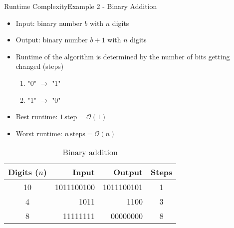 
\begin{frame}{Runtime Complexity}{Example 2 - Binary Addition}
  \begin{itemize}
    \item
      Input: binary number $b$ with $n$ digits
    \item
      Output: binary number $b+1$ with $n$ digits
    \item<2->
      Runtime of the algorithm is determined by the number of bits getting
      changed (steps)
      \begin{enumerate}
        \item "0" $\to$ "1"
        \item "1" $\to$ "0"
      \end{enumerate}
    \item<3->
      {\color{Mittel-Blau}Best runtime:}
      $1\,\text{step} = \mathcal{O}(1)$
    \item<3->
      {\color{Mittel-Blau}Worst runtime:}
      $n\,\text{steps} = \mathcal{O}(n)$
  \end{itemize}
  \vspace{-1.0em}%
  \begin{table}[!h]%
    \caption{Binary addition}%
    \label{tab:runtime:binary_addition}%
    \begin{tabular}{crrc}%
      Digits ($n$) & Input & Output & Steps\\
      \midrule
      10 & 1011100100 & 1011100101 & 1\\
      4 & 1011 & 1100 & 3\\
      8 & 11111111 & 00000000 & 8
    \end{tabular}
  \end{table}
\end{frame}


